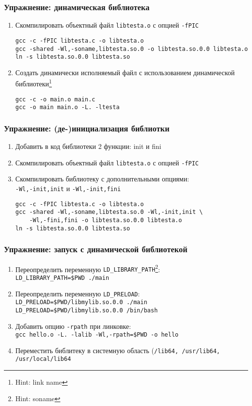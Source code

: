 \begin{frame}[fragile]
	\frametitle{Упражнение: динамическая библиотека}

	\begin{enumerate}
		\item Скомпилировать объектный файл {\tt libtesta.o} с опцией {\tt -fPIC}
		
\begin{verbatim}
gcc -c -fPIC libtesta.c -o libtesta.o
gcc -shared -Wl,-soname,libtesta.so.0 -o libtesta.so.0.0 libtesta.o
ln -s libtesta.so.0.0 libtesta.so
\end{verbatim}
		\item Создать динамически исполняемый файл с использованием динамической библиотеки\footnote{Hint: link name}
\begin{verbatim}
gcc -c -o main.o main.c
gcc -o main main.o -L. -ltesta
\end{verbatim}
	\end{enumerate}
\end{frame}

\begin{frame}[fragile]
	\frametitle{Упражнение: (де-)инициализация библиотки}

	\begin{enumerate}
		\item Добавить в код библиотеки 2 функции: init и fini
		\item Скомпилировать объектный файл {\tt libtesta.o} с опцией {\tt -fPIC}
		\item Скомпилировать библиотеку с дополнительными опциями:\\
		  {\tt -Wl,-init,init} и {\tt -Wl,-init,fini}
\begin{verbatim}
gcc -c -fPIC libtesta.c -o libtesta.o
gcc -shared -Wl,-soname,libtesta.so.0 -Wl,-init,init \
    -Wl,-fini,fini -o libtesta.so.0.0 libtesta.o
ln -s libtesta.so.0.0 libtesta.so
\end{verbatim}
	\end{enumerate}
\end{frame}

\begin{frame}[fragile]
	\frametitle{Упражнение: запуск с динамической библиотекой}

	\begin{enumerate}
		\item Переопределить переменную {\tt LD\_LIBRARY\_PATH}\footnote{Hint: soname}:\\
			{\tt LD\_LIBRARY\_PATH=\$PWD ./main}
		\item Переопределить переменную {\tt LD\_PRELOAD}:\\
			{\tt LD\_PRELOAD=\$PWD/libmylib.so.0.0 ./main}\\
			{\tt LD\_PRELOAD=\$PWD/libmylib.so.0.0 /bin/bash}
		\item Добавить опцию {\tt -rpath} при линковке:\\
			{\tt gcc hello.o -L. -lalib -Wl,-rpath=\$PWD -o hello}
		\item Переместить библитеку в системную область ({\tt /lib64, /usr/lib64, /usr/local/lib64}
	\end{enumerate}
\end{frame}


